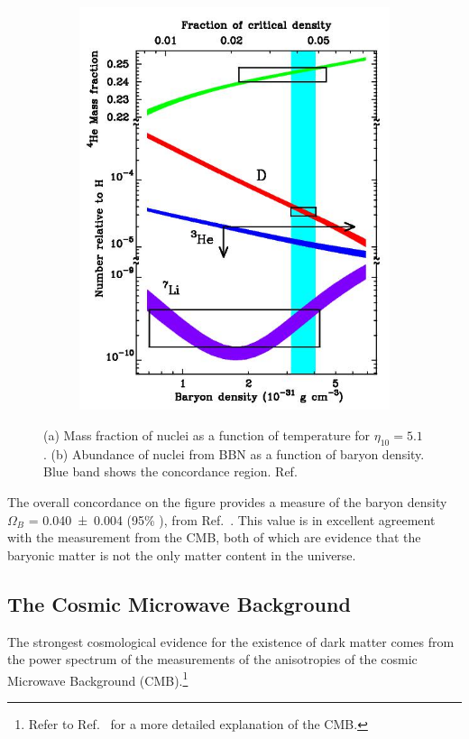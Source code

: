 \begin{figure}[p]
\begin{subfigure}[b]{\figurewidth}
		\includegraphics[width=\halfwidth,clip,trim={0 0 0 0}]{Figures/Intro/BBNBaryonDensity.jpg}
		\caption{}
		\label{fig:BBNb}
	\end{subfigure}
	\caption[Big Bang nucleosynthesis: mass fraction and abundance of nuclei]{(a) Mass fraction of nuclei as a function of temperature for $\eta_{10} = 5.1$. (b) Abundance of nuclei from BBN as a function of baryon density. Blue band shows the concordance region. Ref.~\cite{Tytler2000}} 
	\label{fig:BBN}
\end{figure}

The overall concordance on the figure provides a measure of the baryon density $\Omega_{B}$ = \num[separate-uncertainty=false]{0.040 +- 0.004} (95\% ), from Ref.~\cite{Burles1998, Burles2001}. This value is in excellent agreement with the measurement from the CMB, both of which are evidence that the baryonic matter is not the only matter content in the universe.  

\subsection{The Cosmic Microwave Background}
The strongest cosmological evidence for the existence of dark matter comes from the power spectrum of the measurements of the anisotropies of the cosmic Microwave Background (CMB).\footnote{Refer to Ref.~\cite{Olive2014} for a more detailed explanation of the CMB.}


